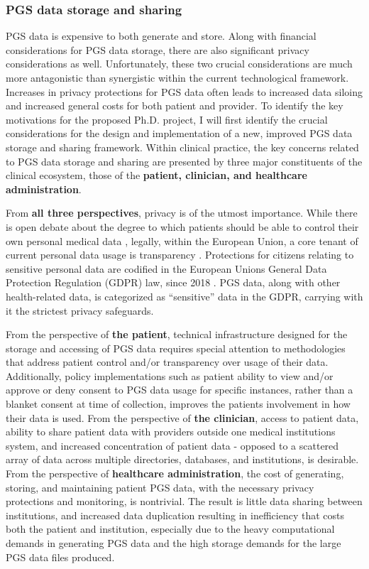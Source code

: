 \documentclass[runningheads]{llncs}
\begin{document}
\subsubsection{PGS data storage and sharing} 
PGS data is expensive to both generate and store. 
Along with financial considerations for PGS data storage, there are also significant privacy considerations as well.
Unfortunately, these two crucial considerations are much more antagonistic than synergistic within the current technological framework.
Increases in privacy protections for PGS data often leads to increased data siloing and increased general costs for both patient and provider.
To identify the key motivations for the proposed Ph.D. project, I will first identify the crucial considerations for the design and implementation of a new, improved PGS data storage and sharing framework.
Within clinical practice, the key concerns related to PGS data storage and sharing are presented by three major constituents of the clinical ecosystem, those of the \textbf{patient, clinician, and healthcare administration}. 

From \textbf{all three perspectives}, privacy is of the utmost importance. 
While there is open debate about the degree to which patients should be able to control their own personal medical data \cite{blumenthal_giving_2015,damen_patients_2022}, legally, within the European Union, a core tenant of current personal data usage is transparency \cite{spagnuelo_qualifying_2020}. 
Protections for citizens relating to sensitive personal data are codified in the European Union\textquotesingle s General Data Protection Regulation (GDPR) law, since 2018 \cite{noauthor_regulation_2016}. 
PGS data, along with other health-related data, is categorized as “sensitive” data in the GDPR, carrying with it the strictest privacy safeguards. 

From the perspective of \textbf{the patient}, technical infrastructure designed for the storage and accessing of PGS data requires special attention to methodologies that address patient control and/or transparency over usage of their data. 
Additionally, policy implementations such as patient ability to view and/or approve or deny consent to PGS data usage for specific instances, rather than a blanket consent at time of collection, improves the patient\textquotesingle s involvement in how their data is used. 
From the perspective of \textbf{the clinician}, access to patient data, ability to share patient data with providers outside one medical institution\textquotesingle s system, and increased concentration of patient data - opposed to a scattered array of data across multiple directories, databases, and institutions, is desirable. 
From the perspective of \textbf{healthcare administration}, the cost of generating, storing, and maintaining patient PGS data, with the necessary privacy protections and monitoring, is nontrivial. 
The result is little data sharing between institutions, and increased data duplication resulting in inefficiency that costs both the patient and institution, especially due to the heavy computational demands in generating PGS data and the high storage demands for the large PGS data files produced. 
\end{document}
